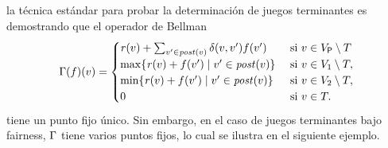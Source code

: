 



la técnica estándar para probar la determinación de juegos terminantes es demostrando que el operador de Bellman
%
\[
    \Gamma(f)(v) =
    \begin{cases}
           \mathit{r}(v)  + \sum_{v' \in \mathit{post}(v)} \delta(v,v')  f(v') & \text{ si } v \in V_{\mathsf{P}} \setminus T  \\
          \max \{\mathit{r}(v)  + f(v') \mid v' \in \mathit{post}(v) \}& \text{ si } v \in  V_1 \setminus T, \\
           \min \{\mathit{r}(v)  + f(v') \mid v' \in \mathit{post}(v) \} & \text{ si } v \in  V_2 \setminus T, \\
           0 & \text{ si } v \in T.
    \end{cases}
\]
%
tiene un punto fijo único. Sin embargo, en el caso de juegos terminantes bajo fairness,  $\Gamma$ tiene varios puntos fijos, lo cual se ilustra en el siguiente ejemplo.

